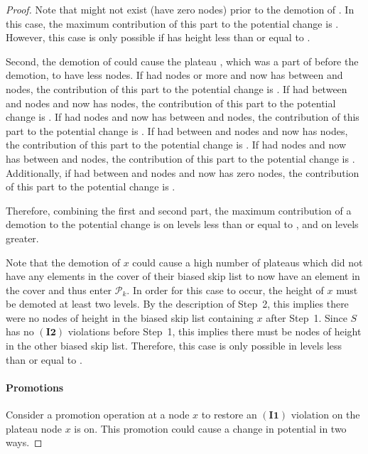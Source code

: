 \documentclass[11pt]{article}
\newcommand{\invone}{\ensuremath{\mathbf{(I1)}}}
\newcommand{\invtwo}{\ensuremath{\mathbf{(I2)}}}
\newcommand{\node}[1]{\ensuremath{#1}}
\newcommand{\bsl}[1]{\ensuremath{#1}}
\newcommand{\plats}[1]{\ensuremath{\mathcal P_{#1}}}
\begin{document}
\begin{proof}
Note that  might not exist (have zero nodes) prior to the demotion of . In this case, the maximum contribution of this part to the potential change is .  However, this case is only possible if  has height less than or equal to . 


Second, the demotion of  could cause the plateau , which  was a part of before the demotion, to have less nodes. 
If  had  nodes or more and now has between  and  nodes, the contribution of this part to the potential change is . 
If  had between  and  nodes and now has  nodes, the contribution of this part to the potential change is . 
If  had  nodes and now has between  and  nodes, the contribution of this part to the potential change is . 
If  had between  and  nodes and now has  nodes, the contribution of this part to the potential change is . 
If  had  nodes and now has between  and  nodes, the contribution of this part to the potential change is . 
Additionally, if  had between  and  nodes and now has zero nodes, the contribution of this part to the potential change is . 

Therefore, combining the first and second part, the maximum contribution of a demotion to the potential change is  on levels less than or equal to , and  on levels greater. 

Note that the demotion of \node x could cause a high number of plateaus which did not have any elements in the cover of their biased skip list to now have an element in the cover and thus enter \plats k. In order for this case to occur, the height of \node x must be demoted at least two levels. By the description of Step~2, this implies there were no nodes of height  in the biased skip list containing \node x after Step~1. Since \bsl S has no \invtwo{} violations before Step~1, this implies there must be nodes of height  in the other biased skip list. Therefore, this case is only possible in levels less than or equal to . 

\paragraph{Promotions} 
Consider a promotion operation at a node \node x to restore an \invone{} violation on the plateau  node \node x is on. This promotion could cause a change in potential in two ways. 


\end{proof}
\end{document}
